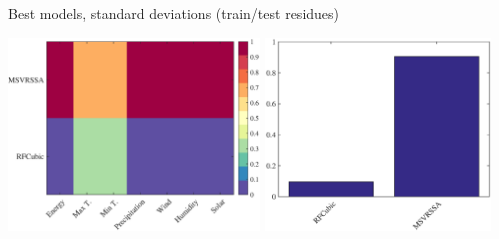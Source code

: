 \documentclass{beamer}
\begin{document}
%
%
\begin{frame}{Best models, standard deviations (train/test residues)}

\includegraphics[width=0.5\textwidth]{fig/feature_selection/EnergyWeather/best_models_trainResStd_colormatrix.eps}
\includegraphics[width=0.45\textwidth]{fig/feature_selection/EnergyWeather/best_models_trainResStd_bar.eps}\\


\end{frame}
\end{document}
